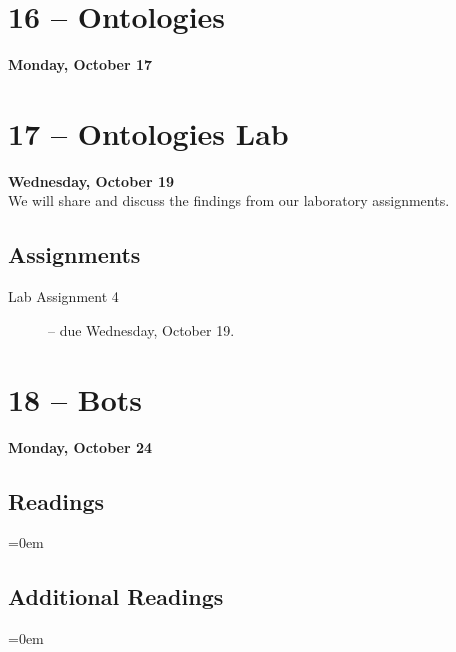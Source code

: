 \documentclass[11pt]{memoir}
\newenvironment{readinglist}{
\begin{list}{}{\leftmargin=8pt \itemindent=0em}
  \setlength{\itemsep}{8pt}
  \setlength{\parskip}{0em}
  \setlength{\parsep}{1em}
  \setlength{\parindent}{8em}}
{\end{list}}
\begin{document}
\section{16 -- Ontologies}
\textcolor{CUGold}{\textbf{Monday, October 17}}\\

\section{17 -- Ontologies Lab}
\textcolor{CUGold}{\textbf{Wednesday, October 19}}\\
We will share and discuss the findings from our laboratory assignments.

    \subsection{Assignments}
    \begin{description}%
        \item[Lab Assignment 4 ] -- due Wednesday, October 19. 
    \end{description}
    
\section{18 -- Bots}
\textcolor{CUGold}{\textbf{Monday, October 24}}\\

    \subsection{Readings}
    \begin{readinglist}
        \item {}
        \item {}
    \end{readinglist}
    
    \subsection{Additional Readings}
    \begin{readinglist}
        \item {}
        \item {}
        \item {}
    \end{readinglist}
\end{document}
